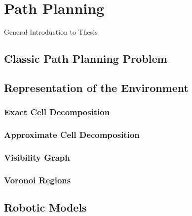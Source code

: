 \chapter{Path Planning}\label{ch:introductionplanning}
General Introduction to Thesis

\section{Classic Path Planning Problem}\label{sec:basic}

\section{Representation of the Environment}\label{sec:representation}
\subsection{Exact Cell Decomposition}\label{sec:exactcelldecomposition}
\subsection{Approximate Cell Decomposition}\label{sec:approxcelldecomposition}
\subsection{Visibility Graph}\label{sec:visgraph}
\subsection{Voronoi Regions}\label{sec:voronoi}

\section{Robotic Models}\label{sec:model}




